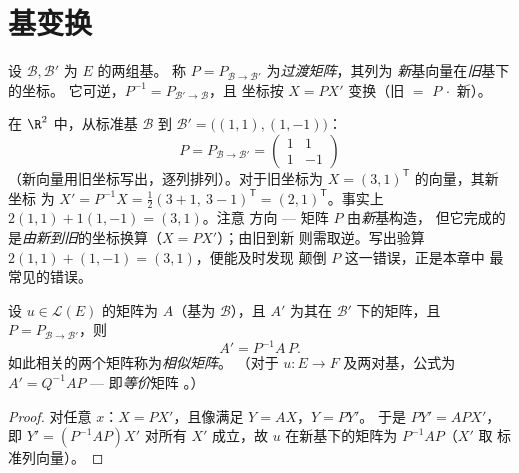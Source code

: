 \section{基变换}

\begin{definition}\label{def:b1:matrices:changeofbasis}
设 $\mathcal{B}, \mathcal{B}'$ 为 $E$ 的两组基。
称 $P =
P_{\mathcal{B}\to\mathcal{B}'}$ 为\emph{过渡矩阵}，其列为
\emph{新}基向量在\emph{旧}基下的坐标。
它可逆，$P^{-1} = P_{\mathcal{B}'\to\mathcal{B}}$，且
坐标按 $X = PX'$ 变换（旧 $=$ $P\,\cdot$ 新）。
\end{definition}

\begin{example}[读懂过渡矩阵]
\label{ex:b1:matrices:changerun}
在 $\R^2$ 中，从标准基 $\mathcal B$ 到 $\mathcal B' =
\bigl((1,1), (1,-1)\bigr)$：
\[
P = P_{\mathcal B\to\mathcal B'} =
\begin{pmatrix} 1 & 1\\ 1 & -1 \end{pmatrix}
\]
（新向量用旧坐标写出，逐列排列）。对于旧坐标为
$X = (3, 1)^{\mathsf T}$ 的向量，其新坐标
为 $X' = P^{-1}X = \frac12(3 + 1,\ 3 - 1)^{\mathsf T} =
(2, 1)^{\mathsf T}$。事实上 $2(1,1) + 1(1,-1) = (3,1)$。注意
方向 --- 矩阵 $P$ 由\emph{新}基构造，
但它完成的是\emph{由新到旧}的坐标换算（$X = PX'$）；由旧到新
则需取逆。写出验算
$2(1,1) + (1,-1) = (3,1)$，便能及时发现
颠倒 $P$ 这一错误，正是本章中
最常见的错误。
\end{example}

\begin{theorem}[映射的基变换]\label{thm:b1:matrices:conjugation}
设 $u \in \mathcal{L}(E)$ 的矩阵为 $A$（基为 $\mathcal{B}$），且 $A'$
为其在 $\mathcal{B}'$ 下的矩阵，且 $P = P_{\mathcal{B}\to\mathcal{B}'}$，则
\[
A' = P^{-1} A\, P .
\]
如此相关的两个矩阵称为\emph{相似矩阵}。
（对于 $u \colon E \to F$ 及两对基，公式为
$A' = Q^{-1} A P$ --- 即\emph{等价}矩阵
。）
\end{theorem}

\begin{proof}
对任意 $x$：$X = PX'$，且像满足 $Y = AX$，$Y = PY'$。
于是 $PY' = APX'$，即 $Y' = (P^{-1}AP)X'$ 对所有 $X'$ 成立，故
$u$ 在新基下的矩阵为 $P^{-1}AP$（$X'$ 取
标准列向量）。
\end{proof}

